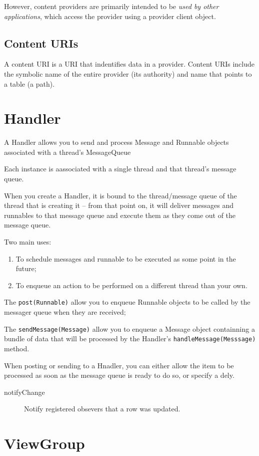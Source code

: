 \documentclass[11pt, a4paper]{book}
\begin{document}
However, content providers are primarily intended to be \emph{used by other
applications}, which access the provider using a provider client object. 

\subsection{Content URIs}
A content URI is a URI that indentifies data in a provider. Content URIs include
the symbolic name of the entire provider (its authority) and name that points to
a table (a path).
\section{Handler}
A Handler allows you to send and process Message and Runnable objects associated
with a thread's MessageQueue

Each instance is aassociated with a single thread and that thread's message
queue.

When you create a Handler, it is bound to the thread/message queue of the thread
that is creating it -- from that point on, it will deliver messages and
runnables to that message queue and execute them as they come out of the message
queue. 

Two main uses:
\begin{enumerate}
\item To schedule messages and runnable to be executed as some point in the
future;
\item To enqueue an action to be performed on a different thread than your own.
\end{enumerate}

The \verb|post(Runnable)| allow you to enqueue Runnable objects to be called by
the messager queue when they are received;

The \verb|sendMessage(Message)| allow you to enqueue a Message object
containning a bundle of data that will be processed by the Handler's
\verb|handleMessage(Messsage)| method.

When posting or sending to a Hnadler, you can either allow the item to be
processed as soon as the message queue is ready to do so, or specify a dely. 
\begin{description}
\item[notifyChange] Notify registered obsevers that a row was updated. 
\end{description}
\section{ViewGroup}
\end{document}
